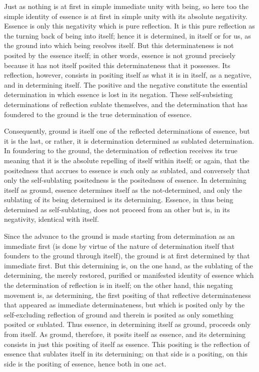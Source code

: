 Just as nothing is at first in simple immediate unity with being,
so here too the simple identity of essence is at first
in simple unity with its absolute negativity.
Essence is only this negativity which is pure reflection.
It is this pure reflection as the turning back of being into itself;
hence it is determined, in itself or for us,
as the ground into which being resolves itself.
But this determinateness is not posited by the essence itself;
in other words, essence is not ground precisely because
it has not itself posited this determinateness that it possesses.
Its reflection, however, consists in positing itself as
what it is in itself, as a negative, and in determining itself.
The positive and the negative constitute the essential determination
in which essence is lost in its negation.
These self-subsisting determinations of reflection sublate themselves,
and the determination that has foundered to the ground is
the true determination of essence.

Consequently, ground is itself one of
the reflected determinations of essence,
but it is the last, or rather,
it is determination determined as sublated determination.
In foundering to the ground, the determination of reflection
receives its true meaning that it is the absolute
repelling of itself within itself;
or again, that the positedness that accrues to essence is such only as sublated,
and conversely that only the self-sublating positedness is the positedness of essence.
In determining itself as ground, essence determines itself as the not-determined,
and only the sublating of its being determined is its determining.
Essence, in thus being determined as self-sublating,
does not proceed from an other but is,
in its negativity, identical with itself.

Since the advance to the ground is made starting from determination
as an immediate first (is done by virtue of the nature of determination
itself that founders to the ground through itself),
the ground is at first determined by that immediate first.
But this determining is, on the one hand,
as the sublating of the determining,
the merely restored, purified or manifested identity of essence
which the determination of reflection is in itself;
on the other hand, this negating movement is, as determining,
the first positing of that reflective determinateness
that appeared as immediate determinateness,
but which is posited only by the self-excluding reflection of ground
and therein is posited as only something posited or sublated.
Thus essence, in determining itself as ground, proceeds only from itself.
As ground, therefore, it posits itself as essence,
and its determining consists in just this positing of itself as essence.
This positing is the reflection of essence that sublates itself in its determining;
on that side is a positing, on this side is the positing of essence,
hence both in one act.

